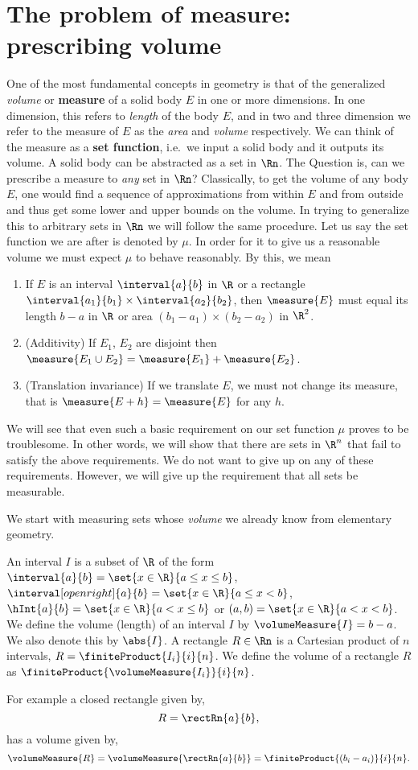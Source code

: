 \chapter{The problem of measure: prescribing volume}
One of the most fundamental concepts in geometry is that of the generalized \emph{volume} or \textbf{measure}
of a solid body $E$ in one or more dimensions. In one dimension, this refers to \emph{length} of the body $E$,
and in two and three dimension we refer to the measure of $E$ as the \emph{area} and \emph{volume}
respectively. We can think of the measure as a \textbf{set function}, i.e.~we input a solid body and it
outputs its volume. A solid body can be abstracted as a set in $\Rn$. The Question is, can we prescribe a
measure to \emph{any} set in $\Rn$?  Classically, to get the volume of any body $E$, one would find a sequence
of approximations from within $E$ and from outside and thus get some lower and upper bounds on the volume. In
trying to generalize this to arbitrary sets in $\Rn$ we will follow the same procedure. Let us say the set
function we are after is denoted by $\mu$. In order for it to give us a reasonable volume we must expect $\mu$
to behave reasonably. By this, we mean
\begin{enumerate}
    \item
	If $E$ is an interval $\interval{a}{b}$ in $\R$ or a rectangle $\interval{a_1}{b_1} \times
	\interval{a_2}{b_2}$, then $\measure{E}$ must equal its length $b-a$ in $\R$ or area
	$(b_1-a_1)\times(b_2-a_2)$ in $\R^2$.
    \item
	(Additivity) If $E_1$, $E_2$ are disjoint then $\measure{E_1\cup E_2} = \measure{E_1}+\measure{E_2}$.
    \item
	(Translation invariance) If we translate $E$, we must not change its measure, 
	that is $\measure{E+h} = \measure{E}$ for any $h$.
\end{enumerate}
We will see that even such a basic requirement on our set function $\mu$ proves to be troublesome. In other
words, we will show that there are sets in $\R^n$ that fail to satisfy the above requirements. We do not want to
give up on any of these requirements. However, we will give up the requirement that all sets be measurable.

We start with measuring sets whose \emph{volume} we already know from elementary geometry.
\begin{Definition}[name= Intervals and rectangles]
    An interval $I$ is a subset of $\R$ of the form $\interval{a}{b} = \set{x\in\R}{a\leq x \leq b}$,
    $\interval[open right]{a}{b} = 
    \set{x\in\R}{a\leq x < b}$, $\hInt{a}{b} = \set{x\in\R}{a < x \leq b}$ or $(a,b)
    = \set{x\in\R}{a < x < b}$. We define the volume (length) of an interval $I$ by $\volumeMeasure{I} = b-a$. 
    We also denote this by $\abs{I}$.
    A rectangle $R \in \Rn $ is a Cartesian product of $n$ intervals, $R = \finiteProduct{I_i}{i}{n}$. We
    define the volume of a rectangle $R$ as $\finiteProduct{\volumeMeasure{I_i}}{i}{n}$. 
\end{Definition}
For example a closed rectangle given by,
\[R = \rectRn{a}{b},\]
has a volume given by,
\[\volumeMeasure{R} = \volumeMeasure{\rectRn{a}{b}} = \finiteProduct{(b_i-a_i)}{i}{n}.\]


